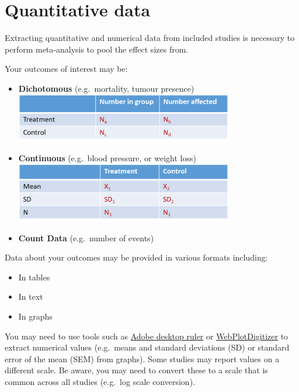 \documentclass[
]{book}
\providecommand{\tightlist}{%
  \setlength{\itemsep}{0pt}\setlength{\parskip}{0pt}}
\begin{document}
\section{Quantitative data}\label{quantitative-data}

Extracting quantitative and numerical data from included studies is necessary to perform meta-analysis to pool the effect sizes from.

Your outcomes of interest may be:

\begin{itemize}
\item
  \textbf{Dichotomous} (e.g.~mortality, tumour presence) \includegraphics[width=0.75\textwidth,height=0.75\textheight]{figs/dichot-outcome.png}
\item
  \textbf{Continuous} (e.g.~blood pressure, or weight loss) \includegraphics[width=0.75\textwidth,height=0.75\textheight]{figs/contin-outcome.png}
\item
  \textbf{Count Data} (e.g.~number of events)
\end{itemize}

Data about your outcomes may be provided in various formats including:

\begin{itemize}
\tightlist
\item
  In tables
\item
  In text
\item
  In graphs
\end{itemize}

You may need to use tools such as \href{https://helpx.adobe.com/acrobat/using/grids-guides-measurements-pdfs.html}{Adobe desktop ruler} or \href{https://automeris.io/WebPlotDigitizer/}{WebPlotDigitizer} to extract numerical values (e.g.~means and standard deviations (SD) or standard error of the mean (SEM) from graphs). Some studies may report values on a different scale. Be aware, you may need to convert these to a scale that is common across all studies (e.g.~log scale conversion).
\end{document}
